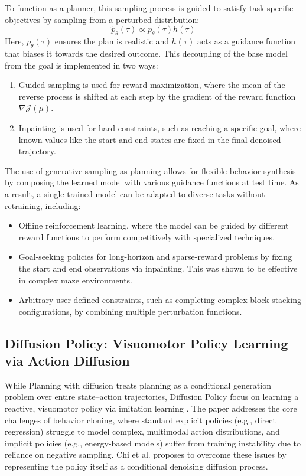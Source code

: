 To function as a planner, this sampling process is guided to satisfy task-specific objectives by sampling from a perturbed distribution:
\begin{equation}
	\tilde{p}_{\theta}(\tau)\propto{p}_{\theta}(\tau)h(\tau)
\end{equation}
Here, ${p}_{\theta}(\tau)$ ensures the plan is realistic and $h(\tau)  $ acts as a guidance function that biases it towards the desired outcome. This decoupling of the base model from the goal is implemented in two ways:
\begin{enumerate}
	\item Guided sampling is used for reward maximization, where the mean of the reverse process is shifted at each step by the gradient of the reward function $\nabla \mathcal{J(\mu)}$.
	\item Inpainting is used for hard constraints, such as reaching a specific goal, where known values like the start and end states are fixed in the final denoised trajectory.
\end{enumerate}
The use of generative sampling as planning allows for flexible behavior synthesis by composing the learned model with various guidance functions at test time. As a result, a single trained model can be adapted to diverse tasks without retraining, including:
\begin{itemize}
	\item Offline reinforcement learning, where the model can be guided by different reward functions to perform competitively with specialized techniques.
	\item Goal-seeking policies for long-horizon and sparse-reward problems by fixing the start and end observations via inpainting. This was shown to be effective in complex maze environments.
	\item Arbitrary user-defined constraints, such as completing complex block-stacking configurations, by combining multiple perturbation functions.
\end{itemize}


\subsection{Diffusion Policy: Visuomotor Policy Learning via Action Diffusion}
While Planning with diffusion treats planning as a conditional generation problem over entire state–action trajectories, Diffusion Policy focus on learning a reactive, visuomotor policy via imitation learning \cite{chiDiffusionPolicyVisuomotor2023}.	The paper addresses the core challenges of behavior cloning, where standard explicit policies (e.g., direct regression) struggle to model complex, multimodal action distributions, and implicit policies (e.g., energy-based models) suffer from training instability due to reliance on negative sampling. Chi et al. proposes to overcome these issues by representing the policy itself as a conditional denoising diffusion process.

